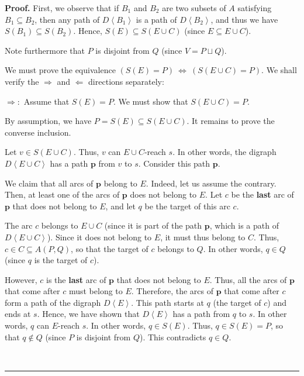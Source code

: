 \documentclass[numbers=enddot,12pt,final,onecolumn,notitlepage]{scrartcl}%
\theoremstyle{definition}
\newenvironment{proof}[1][Proof]{\noindent\textbf{#1.} }{\ \rule{0.5em}{0.5em}}
\theoremstyle{plainsl}
\begin{document}
\begin{proof}
First, we observe that if $B_{1}$ and $B_{2}$ are two subsets of $A$
satisfying $B_{1}\subseteq B_{2}$, then any path of $D\left\langle
B_{1}\right\rangle $ is a path of $D\left\langle B_{2}\right\rangle $, and
thus we have $S\left(  B_{1}\right)  \subseteq S\left(  B_{2}\right)  $.
Hence, $S\left(  E\right)  \subseteq S\left(  E\cup C\right)  $ (since
$E\subseteq E\cup C$).

Note furthermore that $P$ is disjoint from $Q$ (since $V=P\sqcup Q$).

We must prove the equivalence $\left(  S\left(  E\right)  =P\right)
\ \Longleftrightarrow\ \left(  S\left(  E\cup C\right)  =P\right)  $. We shall
verify the $\Longrightarrow$ and $\Longleftarrow$ directions separately:
\medskip

$\Longrightarrow:$ Assume that $S\left(  E\right)  =P$. We must show that
$S\left(  E\cup C\right)  =P$.

By assumption, we have $P=S\left(  E\right)  \subseteq S\left(  E\cup
C\right)  $. It remains to prove the converse inclusion.

Let $v\in S\left(  E\cup C\right)  $. Thus, $v$ can $E\cup C$-reach $s$. In
other words, the digraph $D\left\langle E\cup C\right\rangle $ has a path
$\mathbf{p}$ from $v$ to $s$. Consider this path $\mathbf{p}$.

We claim that all arcs of $\mathbf{p}$ belong to $E$. Indeed, let us assume
the contrary. Then, at least one of the arcs of $\mathbf{p}$ does not belong
to $E$. Let $c$ be the \textbf{last} arc of $\mathbf{p}$ that does not belong
to $E$, and let $q$ be the target of this arc $c$.

The arc $c$ belongs to $E\cup C$ (since it is part of the path $\mathbf{p}$,
which is a path of $D\left\langle E\cup C\right\rangle $). Since it does not
belong to $E$, it must thus belong to $C$. Thus, $c\in C\subseteq A\left(
P,Q\right)  $, so that the target of $c$ belongs to $Q$. In other words, $q\in
Q$ (since $q$ is the target of $c$).

However, $c$ is the \textbf{last} arc of $\mathbf{p}$ that does not belong to
$E$. Thus, all the arcs of $\mathbf{p}$ that come after $c$ must belong to
$E$. Therefore, the arcs of $\mathbf{p}$ that come after $c$ form a path of
the digraph $D\left\langle E\right\rangle $. This path starts at $q$ (the
target of $c$) and ends at $s$. Hence, we have shown that $D\left\langle
E\right\rangle $ has a path from $q$ to $s$. In other words, $q$ can $E$-reach
$s$. In other words, $q\in S\left(  E\right)  $. Thus, $q\in S\left(
E\right)  =P$, so that $q\notin Q$ (since $P$ is disjoint from $Q$). This
contradicts $q\in Q$.


\end{proof}
\end{document}
